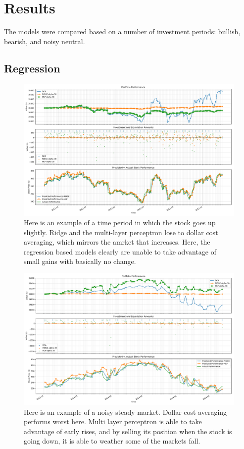 \documentclass[12pt]{article}
\begin{document}
\section{Results}
The models were compared based on a number of investment periods: bullish, bearish, and noisy neutral.
\subsection{Regression}

\begin{figure}
	\centering
	\includegraphics[width=0.7\linewidth]{../Results/GOOG-DCA-RIDGE-MLP-2010-12-02--2011-12-12-alphas--[30]-train_length-500-performanceplot}
	\caption{Here is an example of a time period in which the stock goes up slightly. Ridge and the multi-layer perceptron lose to dollar cost averaging, which mirrors the amrket that increases. Here, the regression based models clearly are unable to take advantage of small gains with basically no change.}
	\label{fig:goog-dca-ridge-mlp-2010-12-02--2011-12-12-alphas--30-trainlength-500-performanceplot}
\end{figure}

\begin{figure}
	\centering
	\includegraphics[width=0.7\linewidth]{../Results/GOOG-DCA-RIDGE-MLP-2013-12-02--2014-05-12-alphas--[30]-train_length-500-performanceplot}
	\caption{Here is an example of a noisy steady market. Dollar cost averaging performs worst here. Multi layer perceptron is able to take advantage of early rises, and by selling its position when the stock is going down, it is able to weather some of the markets fall.}
	\label{fig:goog-dca-ridge-mlp-2013-12-02--2014-05-12-alphas--30-trainlength-500-performanceplot}
\end{figure}
\end{document}
